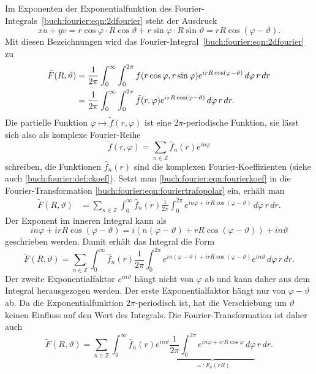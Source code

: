 Im Exponenten der Exponentialfunktion
des Fourier-Integrals~\eqref{buch:fourier:eqn:2dfourier}
%
steht der Ausdruck
\[
xu+yv
=
r\cos\varphi\cdot R\cos\vartheta
+
r\sin\varphi\cdot R\sin\vartheta
=
rR\cos(\varphi-\vartheta).
\]
Mit diesen Bezeichnungen wird das
Fourier-Integral~\eqref{buch:fourier:eqn:2dfourier}
zu
\begin{align}
\tilde{F}(R,\vartheta)
&=
\frac{1}{2\pi}
\int_{0}^{\infty}
\int_{0}^{2\pi}
f(r\cos\varphi,r\sin\varphi)
e^{irR\cos(\varphi-\vartheta)}
\,d\varphi\,r\, dr
\notag
\\
&=
\frac{1}{2\pi}
\int_{0}^{\infty}
\int_{0}^{2\pi}
\tilde{f}(r,\varphi)
e^{irR\cos(\varphi-\vartheta)}
\,d\varphi\,r\, dr.
\label{buch:fourier:eqn:fouriertrafopolar}
\end{align}
Die partielle Funktion $\varphi\mapsto \tilde{f}(r,\varphi)$
ist eine $2\pi$-periodische Funktion, sie lässt sich also als
komplexe Fourier-Reihe
\begin{equation}
\tilde{f}(r,\varphi)
=
\sum_{n\in\mathbb{Z}} \hat{f}_n(r) e^{in\varphi}
\label{buch:fourier:eqn:fourierkoef}
\end{equation}
schreiben, die Funktionen $\hat{f}_n(r)$ sind die komplexen
Fourier-Koeffizienten (siehe auch \eqref{buch:fourier:def:ckoef}).
Setzt man \eqref{buch:fourier:eqn:fourierkoef} in die Fourier-Transformation
\eqref{buch:fourier:eqn:fouriertrafopolar} ein, erhält man
\begin{align*}
\tilde{F}(R,\vartheta)
&=
\sum_{n\in\mathbb{Z}}
\int_0^\infty
\hat{f}_n(r)
\frac{1}{2\pi}
\int_0^{2\pi}
e^{in\varphi+irR\cos(\varphi-\vartheta)}
\,d\varphi
\,
r\,dr.
\end{align*}
Der Exponent im inneren Integral kann als
\[
in\varphi+irR\cos(\varphi-\vartheta)
=
i(n(\varphi-\vartheta)+rR\cos(\varphi-\vartheta))
+
in\vartheta
\]
geschrieben werden.
Damit erhält das Integral die Form
\[
\tilde{F}(R,\vartheta)
=
\sum_{n\in\mathbb{Z}}
\int_0^\infty
\hat{f}_n(r)
\frac{1}{2\pi}
\int_0^{2\pi}
e^{in(\varphi-\vartheta)+irR\cos(\varphi-\vartheta)}
e^{in\vartheta}
\,d\varphi
\,
r\,dr.
\]
Der zweite Exponentialfaktor $e^{in\vartheta}$
hängt nicht von $\varphi$ ab und kann daher
aus dem Integral herausgezogen werden.
Der erste Exponentialfaktor hängt nur von $\varphi-\vartheta$ ab.
Da die Exponentialfunktion $2\pi$-periodisch ist, hat die Verschiebung
um $\vartheta$ keinen Einfluss auf den Wert des Integrals.
Die Fourier-Transformation ist daher auch
\[
\tilde{F}(R,\vartheta)
=
\sum_{n\in\mathbb{Z}}
\int_0^\infty
\hat{f}_n(r)
e^{in\vartheta}
\underbrace{
\frac{1}{2\pi}
\int_0^{2\pi}
e^{in\varphi+irR\cos\varphi}
\,d\varphi
}_{\displaystyle =:F_n(rR)}
\,
r\,dr.
\]
